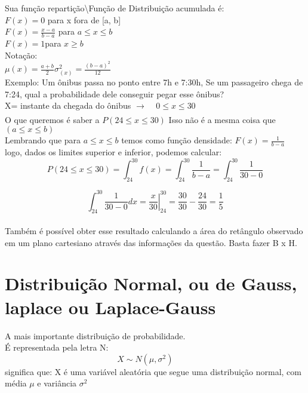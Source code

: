 \documentclass{article}
\begin{document}
{Sua função repartição\textbackslash Função de Distribuição acumulada é:\\

\noindent$F(x) = 0$\hspace{1.5cm} para x fora de [a, b]\\
$F(x)=\frac{x-a}{b-a}$\hspace{1cm} \;para $a\leq x \leq b$\\
$F(x)= 1$\hspace{1.5cm}\;para $x \geq b$\\

\noindent Notação:\\

\noindent$\displaystyle\mu(x)=\frac{a+b}{2}$\;\;\;\;\;\;\;\;\;\;\;\;\;\;$\displaystyle\sigma^2_{(x)}=\frac{(b-a)^2}{12}$\\

\noindent Exemplo: Um ônibus passa no ponto entre 7h e 7:30h, Se um passageiro chega de 7:24, qual a probabilidade dele conseguir pegar esse ônibus?\\

\noindent X= instante da chegada do ônibus\;\;\;\; $\xrightarrow[\;\;\;\;\;]{}\;\;\;\; 0\leq x \leq 30$\\
O que queremos é saber a $P(24\leq x\leq30)$ Isso não é a mesma coisa que $(a\leq x \leq b)$ \\
Lembrando que para $a\leq x \leq b$ temos como função densidade: $F(x)=\frac{1}{b-a}$\\

logo, dados os  limites superior e inferior, podemos calcular:\\
\[P(24\leq x\leq30)= \int^{30}_{24} f(x)=\int^{30}_{24}\frac{1}{b-a}=\int^{30}_{24}\frac{1}{30-0}\]

\[\int^{30}_{24}\frac{1}{30-0}dx=\left. \frac{x}{30} \right|_{24}^{30}=\frac{30}{30}-\frac{24}{30}=\boxed{\frac{1}{5}} \]\\
Também é possível obter esse resultado calculando a área do retângulo observado em um plano cartesiano através das informações da questão. Basta fazer B x H.
\newpage
\section{Distribuição Normal, ou de Gauss, laplace ou Laplace-Gauss}
A mais importante distribuição de probabilidade.\\
É representada pela letra N:\\
\[X \sim N(\mu,\sigma^2)\hspace{1cm}\]
significa que: X é uma variável aleatória que segue uma distribuição normal, com média $\mu$ e variância $\sigma^2$}\\
\end{document}
